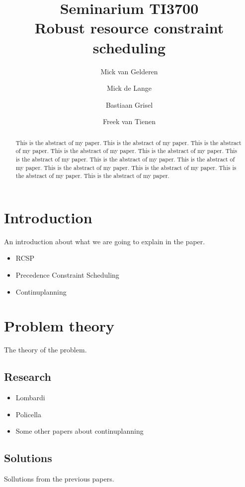\documentclass{article}
\title{Seminarium TI3700\\Robust resource constraint scheduling}
\author{Mick van Gelderen  \and
    Mick de Lange \and
    Bastiaan Grisel \and
    Freek van Tienen}
\date{}
\begin{document}
\maketitle
\thispagestyle{empty}

\begin{abstract}
This is the abstract of my paper.
This is the abstract of my paper.
This is the abstract of my paper.
This is the abstract of my paper.
This is the abstract of my paper.
This is the abstract of my paper.
This is the abstract of my paper.
This is the abstract of my paper.
This is the abstract of my paper.
This is the abstract of my paper.
This is the abstract of my paper.
This is the abstract of my paper.
\end{abstract}


\section{Introduction}

An introduction about what we are going to explain in the paper.

\begin{itemize}
\item RCSP
\item Precedence Constraint Scheduling
\item Continuplanning
\end{itemize}


\section{Problem theory}

The theory of the problem.

\subsection{Research}

\begin{itemize}
\item Lombardi
\item Policella
\item Some other papers about continuplanning
\end{itemize}

\subsection{Solutions}

Sollutions from the previous papers.
\end{document}
